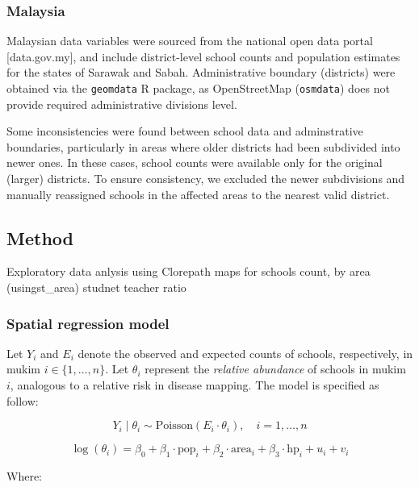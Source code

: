\documentclass[
  12pt,
]{article}
\begin{document}
\subsubsection{Malaysia}\label{malaysia}

Malaysian data variables were sourced from the national open data portal
{[}data.gov.my{]}, and include district-level school counts and
population estimates for the states of Sarawak and Sabah. Administrative
boundary (districts) were obtained via the \texttt{geomdata} R package,
as OpenStreetMap (\texttt{osmdata}) does not provide required
administrative divisions level.

Some inconsistencies were found between school data and adminstrative
boundaries, particularly in areas where older districts had been
subdivided into newer ones. In these cases, school counts were available
only for the original (larger) districts. To ensure consistency, we
excluded the newer subdivisions and manually reassigned schools in the
affected areas to the nearest valid district.

\subsection{Method}\label{sec-method}

Exploratory data anlysis using Clorepath maps for schools count, by area
(usingst\_area) studnet teacher ratio

\subsubsection{Spatial regression model}\label{spatial-regression-model}

Let \(Y_i\) and \(E_i\) denote the observed and expected counts of
schools, respectively, in mukim \(i \in \{1, \dotsc, n\}\). Let
\(\theta_i\) represent the \emph{relative abundance} of schools in mukim
\(i\), analogous to a relative risk in disease mapping. The model is
specified as follow:

\[
Y_i \mid \theta_i \sim \text{Poisson}(E_i \cdot \theta_i), \quad i = 1, \dotsc, n
\]

\[
\log(\theta_i) = \beta_0 + \beta_1 \cdot \text{pop}_i + \beta_2 \cdot \text{area}_i + \beta_3 \cdot \text{hp}_i + u_i + v_i
\]

Where:
\end{document}
